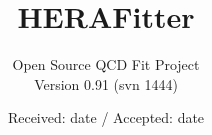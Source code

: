 \usepackage{tikz}
\usetikzlibrary{arrows,shapes,positioning}

\usepackage{multirow}




\usepackage{xspace}
\providecommand{\fitter}{{\texttt{HERAFitter}}\xspace}
\providecommand{\fastnlo}{{\texttt{fastNLO}}\xspace}
\providecommand{\applgrid}{{\texttt{APPLGRID}}\xspace}
\providecommand{\qcdnum}{{\texttt{QCDNUM}}\xspace}
\providecommand{\mcfm}{{\texttt{MCFM}}\xspace}
\providecommand{\nlojetpp}{{\texttt{NLOJet++}}\xspace}
\providecommand{\lhapdf}{{\texttt{LHAPDF}}\xspace}
\providecommand{\crundec}{{\texttt{CRunDec}}\xspace}
\providecommand{\hoppet}{{\texttt{HOPPET}}\xspace}
\providecommand{\GeV}{\ensuremath{\,\text{Ge\hspace{-.08em}V}}\xspace}
\providecommand{\pperp}{\ensuremath{p_{\perp}}\xspace}
\providecommand{\mur}{\ensuremath{\mu_\mathrm{R}}\xspace}
\providecommand{\muf}{\ensuremath{\mu_\mathrm{F}}\xspace}
\providecommand{\as}{\ensuremath{\alpha_\mathrm{s}}\xspace}
\providecommand{\asmz}{\ensuremath{\alpha_\mathrm{s}(M_Z)}\xspace}
\providecommand{\asq}{\ensuremath{\alpha_\mathrm{s}(Q)}\xspace}
\providecommand{\tmdlib}{{\texttt{TMDlib}}\xspace}


%
%


\title{HERAFitter %
}
\subtitle{Open Source QCD Fit Project \\
    { \small {Version 0.91 (svn 1444)}}
}



%
%



\date{Received: date / Accepted: date}


